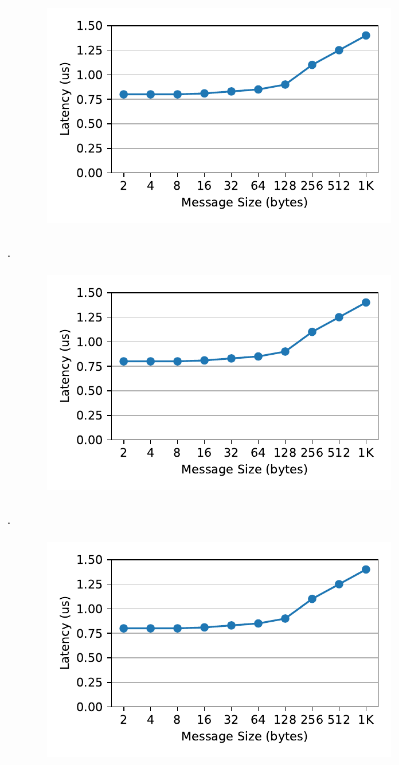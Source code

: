 \begin{figure}[t]
    \centering
    \begin{subfigure}{0.3\linewidth}
        \includegraphics[width=0.99\linewidth]{fig/rdma_latency.pdf}
    \end{subfigure}.
    \begin{subfigure}{0.3\linewidth}
        \includegraphics[width=0.99\linewidth]{fig/rdma_latency.pdf}
    \end{subfigure}.
    \begin{subfigure}{0.3\linewidth}
        \includegraphics[width=0.99\linewidth]{fig/rdma_latency.pdf}

\end{subfigure}
\end{figure}

